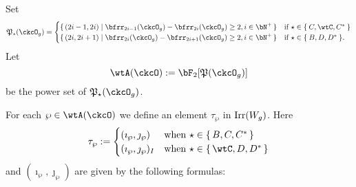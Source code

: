 \documentclass[12pt,a4paper]{amsart}
\numberwithin{equation}{section}
\theoremstyle{remark}
\def\Irr{\mathrm{Irr}}
\def\CPP{\mathfrak{P}}
\def\CPPs{\mathfrak{P}_{\star}}
\def\imathp{\imath_{\sP}}
\def\jmathp{\jmath_{\sP}}
\def\sP{\wp}
\begin{document}
  Set
  \[
    \CPPs(\ckcO_{g}) =
    \begin{cases}
      \set{(2i-1,2i)| \bfrr_{2i-1}(\ckcO_{g})- \bfrr_{2i}(\ckcO_{g})\geq
        2, %
        i\in \bN^{+}} & \text{if $\star\in \Set{C,\wtC,C^{*}}$}\\
      \set{(2i,2i+1)| \bfrr_{2i}(\ckcO_{g})- \bfrr_{2i+1}(\ckcO_{g})\geq
        2, %
        i\in \bN^{+}} & \text{if $\star\in \Set{B,D,D^{*}}$}.
    \end{cases}
  \]
  Let
  \[
    \wtA(\ckcO) := \bF_{2}[\CPP(\ckcO_{g})]
  \] be the power set of $\CPPs(\ckcO_{g})$.

  For each $\wp\in \wtA(\ckcO)$ we define an element $\tau_{\wp}$ in
  $\Irr(\Wg)$. Here
  \[
    \tau_{\wp} :=
    \begin{cases}
      (\imathp,\jmathp) & \text{when } \star \in \set{B,C, C^{*} } \\
      (\imathp,\jmathp)_{I} & \text{when } \star \in \set{\wtC,D,D^{*}}
    \end{cases}
  \]
  and $(\imathp, \jmathp)$ are given by the following formulas:
\end{document}
